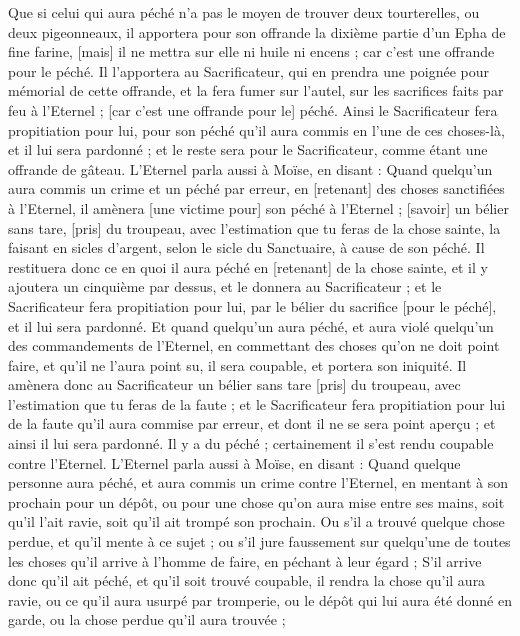 \begin{multicols}{2}
Que si celui qui aura péché n'a pas le moyen de trouver deux tourterelles, ou deux pigeonneaux, il apportera pour son offrande la dixième partie d'un Epha de fine farine, [mais] il ne mettra sur elle ni huile ni encens ; car c'est une offrande pour le péché.
Il l'apportera au Sacrificateur, qui en prendra une poignée pour mémorial de cette offrande, et la fera fumer sur l'autel, sur les sacrifices faits par feu à l'Eternel ; [car c'est une offrande pour le] péché.
Ainsi le Sacrificateur fera propitiation pour lui, pour son péché qu'il aura commis en l'une de ces choses-là, et il lui sera pardonné ; et le reste sera pour le Sacrificateur, comme étant une offrande de gâteau.
L'Eternel parla aussi à Moïse, en disant :
Quand quelqu'un aura commis un crime et un péché par erreur, en [retenant] des choses sanctifiées à l'Eternel, il amènera [une victime pour] son péché à l'Eternel ; [savoir] un bélier sans tare, [pris] du troupeau, avec l'estimation que tu feras de la chose sainte, la faisant en sicles d'argent, selon le sicle du Sanctuaire, à cause de son péché.
Il restituera donc ce en quoi il aura péché en [retenant] de la chose sainte, et il y ajoutera un cinquième par dessus, et le donnera au Sacrificateur ; et le Sacrificateur fera propitiation pour lui, par le bélier du sacrifice [pour le péché], et il lui sera pardonné.
Et quand quelqu'un aura péché, et aura violé quelqu'un des commandements de l'Eternel, en commettant des choses qu'on ne doit point faire, et qu'il ne l'aura point su, il sera coupable, et portera son iniquité.
Il amènera donc au Sacrificateur un bélier sans tare [pris] du troupeau, avec l'estimation que tu feras de la faute ; et le Sacrificateur fera propitiation pour lui de la faute qu'il aura commise par erreur, et dont il ne se sera point aperçu ; et ainsi il lui sera pardonné.
Il y a du péché ; certainement il s'est rendu coupable contre l'Eternel.
\VerseOne{}L'Eternel parla aussi à Moïse, en disant :
Quand quelque personne aura péché, et aura commis un crime contre l'Eternel, en mentant à son prochain pour un dépôt, ou pour une chose qu'on aura mise entre ses mains, soit qu'il l'ait ravie, soit qu'il ait trompé son prochain.
Ou s'il a trouvé quelque chose perdue, et qu'il mente à ce sujet ; ou s'il jure faussement sur quelqu'une de toutes les choses qu'il arrive à l'homme de faire, en péchant à leur égard ;
S'il arrive donc qu'il ait péché, et qu'il soit trouvé coupable, il rendra la chose qu'il aura ravie, ou ce qu'il aura usurpé par tromperie, ou le dépôt qui lui aura été donné en garde, ou la chose perdue qu'il aura trouvée ;

\end{multicols}
